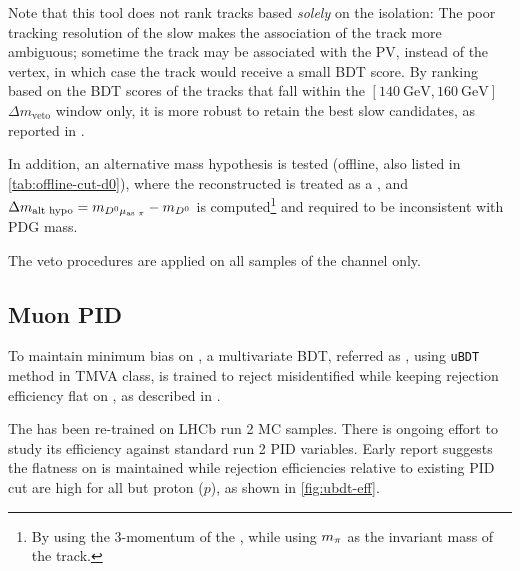 Note that this tool does not rank tracks based \emph{solely} on the isolation:
The poor tracking resolution of the slow \pion makes the association of
the track more ambiguous; sometime the track may be associated with the PV,
instead of the \B vertex, in which case the track would receive a small BDT
score.
By ranking based on the BDT scores of the tracks that fall within the
$[140~\text{GeV}, 160~\text{GeV}]$
$\Delta m_\text{veto}$ window only,
it is more robust to retain the best slow \pion candidates,
as reported in \cite{LHCb-ANA-2020-056}.

In addition, an alternative mass hypothesis is tested
(offline, also listed in \cref{tab:offline-cut-d0}), where the reconstructed
\muon is treated as a \pion,
and $\Delta m_\text{alt hypo} = m_{{{D}^0}{\mu}_\text{as {\ensuremath{\pi}}}} - m_{{D}^0}$
is computed\footnote{
    By using the 3-momentum of the \muon, while using $m_{\pi}$ as the invariant
    mass of the track.
} and required to be inconsistent with \Dstar PDG mass.

The veto procedures are applied on all samples of the \Dz channel only.


\subsection{Muon PID}
\label{ref:sel:tech:ubdt}

To maintain minimum bias on \muon \pt, a multivariate BDT,
referred as \UBDT, using \texttt{uBDT} method in TMVA class,
is trained to reject misidentified \muon while keeping rejection
efficiency flat on \pt,
as described in \cite{LHCb-ANA-2020-056}.

The \UBDT has been re-trained on LHCb run 2 MC samples.
There is ongoing effort to study its efficiency against standard run 2 PID
variables.
Early report suggests the flatness on \pt is maintained while rejection
efficiencies relative to existing PID cut are high for all but proton ($p$),
as shown in \cref{fig:ubdt-eff}.

